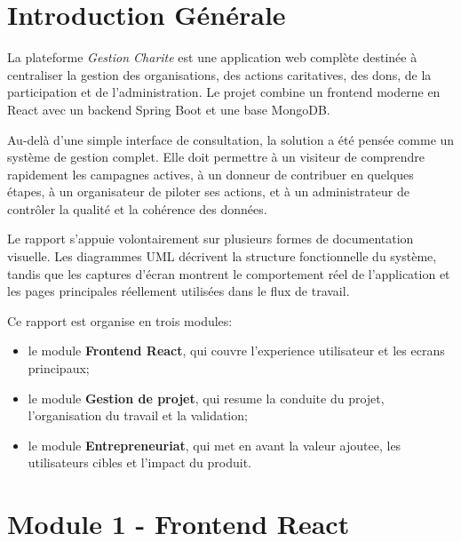 \documentclass[12pt,a4paper]{report}
\begin{document}
\newpage
\listoffigures
{}

\newpage
\listoftables
{}

\newpage
\tableofcontents
\clearpage

\cleardoublepage
{}

\chapter*{Introduction Générale}
La plateforme \textit{Gestion Charite} est une application web complète destinée à centraliser la gestion des organisations, des actions caritatives, des dons, de la participation et de l'administration.
Le projet combine un frontend moderne en React avec un backend Spring Boot et une base MongoDB.

Au-delà d'une simple interface de consultation, la solution a été pensée comme un système de gestion complet. Elle doit permettre à un visiteur de comprendre rapidement les campagnes actives, à un donneur de contribuer en quelques étapes, à un organisateur de piloter ses actions, et à un administrateur de contrôler la qualité et la cohérence des données.

Le rapport s'appuie volontairement sur plusieurs formes de documentation visuelle. Les diagrammes UML décrivent la structure fonctionnelle du système, tandis que les captures d'écran montrent le comportement réel de l'application et les pages principales réellement utilisées dans le flux de travail.

Ce rapport est organise en trois modules:
\begin{itemize}[leftmargin=1.2cm]
  \item le module \textbf{Frontend React}, qui couvre l'experience utilisateur et les ecrans principaux;
  \item le module \textbf{Gestion de projet}, qui resume la conduite du projet, l'organisation du travail et la validation;
  \item le module \textbf{Entrepreneuriat}, qui met en avant la valeur ajoutee, les utilisateurs cibles et l'impact du produit.
\end{itemize}

\chapter{Module 1 - Frontend React}
\end{document}
